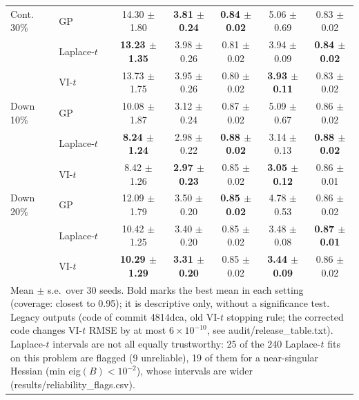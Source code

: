 \begin{tabular}{llccccc}
\midrule
Cont. 30\% & GP & 14.30 $\pm$ 1.80 & \textbf{3.81 $\pm$ 0.24} & \textbf{0.84 $\pm$ 0.02} & 5.06 $\pm$ 0.69 & 0.83 $\pm$ 0.02 \\
 & Laplace-$t$ & \textbf{13.23 $\pm$ 1.35} & 3.98 $\pm$ 0.26 & 0.81 $\pm$ 0.02 & 3.94 $\pm$ 0.09 & \textbf{0.84 $\pm$ 0.02} \\
 & VI-$t$ & 13.73 $\pm$ 1.75 & 3.95 $\pm$ 0.26 & 0.80 $\pm$ 0.02 & \textbf{3.93 $\pm$ 0.11} & 0.83 $\pm$ 0.02 \\
\midrule
Down 10\% & GP & 10.08 $\pm$ 1.87 & 3.12 $\pm$ 0.24 & 0.87 $\pm$ 0.02 & 5.09 $\pm$ 0.67 & 0.86 $\pm$ 0.02 \\
 & Laplace-$t$ & \textbf{8.24 $\pm$ 1.24} & 2.98 $\pm$ 0.22 & \textbf{0.88 $\pm$ 0.02} & 3.14 $\pm$ 0.13 & \textbf{0.88 $\pm$ 0.02} \\
 & VI-$t$ & 8.42 $\pm$ 1.26 & \textbf{2.97 $\pm$ 0.23} & 0.85 $\pm$ 0.02 & \textbf{3.05 $\pm$ 0.12} & 0.86 $\pm$ 0.01 \\
\midrule
Down 20\% & GP & 12.09 $\pm$ 1.79 & 3.50 $\pm$ 0.20 & \textbf{0.85 $\pm$ 0.02} & 4.78 $\pm$ 0.53 & 0.86 $\pm$ 0.02 \\
 & Laplace-$t$ & 10.42 $\pm$ 1.25 & 3.40 $\pm$ 0.20 & 0.85 $\pm$ 0.02 & 3.48 $\pm$ 0.08 & \textbf{0.87 $\pm$ 0.01} \\
 & VI-$t$ & \textbf{10.29 $\pm$ 1.29} & \textbf{3.31 $\pm$ 0.20} & 0.85 $\pm$ 0.02 & \textbf{3.44 $\pm$ 0.09} & 0.86 $\pm$ 0.02 \\
\bottomrule
\multicolumn{7}{p{14cm}}{\footnotesize Mean $\pm$ s.e.\ over 30 seeds. Bold marks the best mean in each setting (coverage: closest to 0.95); it is descriptive only, without a significance test. Legacy outputs (code of commit 4814dca, old VI-$t$ stopping rule; the corrected code changes VI-$t$ RMSE by at most $6\times10^{-10}$, see audit/release\_table.txt). Laplace-$t$ intervals are not all equally trustworthy: 25 of the 240 Laplace-$t$ fits on this problem are flagged (9 unreliable), 19 of them for a near-singular Hessian (min eig$(B)<10^{-2}$), whose intervals are wider (results/reliability\_flags.csv).} \\
\end{tabular}
